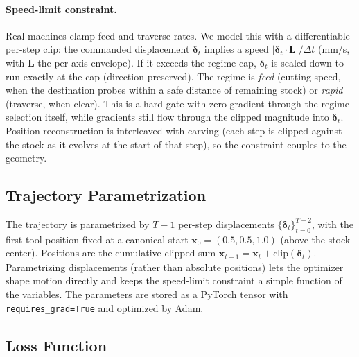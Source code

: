 \paragraph{Speed-limit constraint.}
Real machines clamp feed and traverse rates. We model this with a differentiable
per-step clip: the commanded displacement $\boldsymbol{\delta}_t$ implies a speed
$|\boldsymbol{\delta}_t \cdot \mathbf{L}|/\Delta t$ (mm/s, with $\mathbf{L}$ the
per-axis envelope). If it exceeds the regime cap, $\boldsymbol{\delta}_t$ is
scaled down to run exactly at the cap (direction preserved). The regime is
\emph{feed} (cutting speed, when the destination probes within a safe distance of
remaining stock) or \emph{rapid} (traverse, when clear). This is a hard gate with
zero gradient through the regime selection itself, while gradients still flow
through the clipped magnitude into $\boldsymbol{\delta}_t$. Position
reconstruction is interleaved with carving (each step is clipped against the
stock as it evolves at the start of that step), so the constraint couples to the
geometry.

\subsection{Trajectory Parametrization}
\label{sec:param}

The trajectory is parametrized by $T{-}1$ per-step displacements
$\{\boldsymbol{\delta}_t\}_{t=0}^{T-2}$, with the first tool position fixed at a
canonical start $\mathbf{x}_0 = (0.5, 0.5, 1.0)$ (above the stock center).
Positions are the cumulative clipped sum
$\mathbf{x}_{t+1} = \mathbf{x}_t + \mathrm{clip}(\boldsymbol{\delta}_t)$.
Parametrizing displacements (rather than absolute positions) lets the optimizer
shape motion directly and keeps the speed-limit constraint a simple function of
the variables. The parameters are stored as a PyTorch tensor with
\texttt{requires\_grad=True} and optimized by Adam.

\subsection{Loss Function}
\label{sec:loss}

